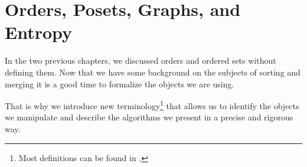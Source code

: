 \chapter{Orders, Posets, Graphs, and Entropy}

In the two previous chapters, we discussed orders and ordered sets without
defining them. Now that we have some background on the subjects of
sorting and merging it is a good time to formalize the objects we are using.

That is why we introduce new terminology\footnote{
Most definitions can be found in \citet*{Stanley:2011:ECV:2124415}.
}
that allows
us to identify the objects we manipulate and describe the algorithms we present
in a precise and rigorous way.
